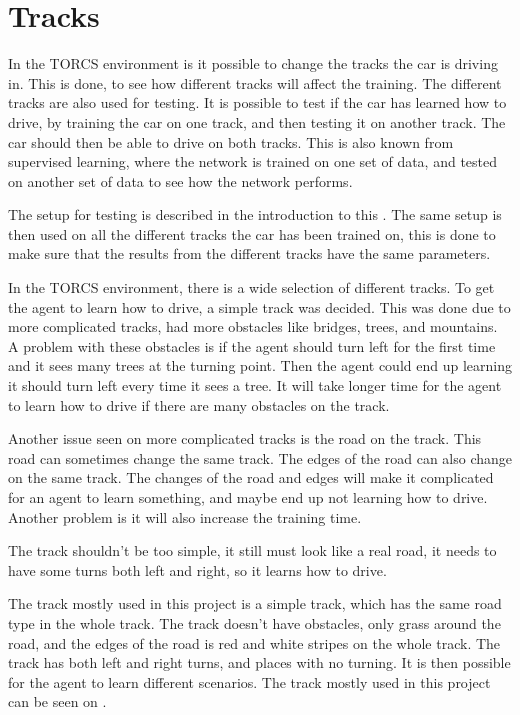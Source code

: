 \section{Tracks}\label{Tracks}
In the TORCS environment is it possible to change the tracks the car is driving in. This is done, to see how different tracks will affect the training. The different tracks are also used for testing. It is possible to test if the car has learned how to drive, by training the car on one track, and then testing it on another track. The car should then be able to drive on both tracks. This is also known from supervised learning, where the network is trained on one set of data, and tested on another set of data to see how the network performs.   

The setup for testing is described in the introduction to this . The same setup is then used on all the different tracks the car has been trained on, this is done to make sure that the results from the different tracks have the same parameters.  

In the TORCS environment, there is a wide selection of different tracks. To get the agent to learn how to drive, a simple track was decided. This was done due to more complicated tracks, had more obstacles like bridges, trees, and mountains. A problem with these obstacles is if the agent should turn left for the first time and it sees many trees at the turning point. Then the agent could end up learning it should turn left every time it sees a tree. It will take longer time for the agent to learn how to drive if there are many obstacles on the track.   

Another issue seen on more complicated tracks is the road on the track. This road can sometimes change the same track. The edges of the road can also change on the same track. The changes of the road and edges will make it complicated for an agent to learn something, and maybe end up not learning how to drive. Another problem is it will also increase the training time. 

The track shouldn't be too simple, it still must look like a real road, it needs to have some turns both left and right, so it learns how to drive. 

The track mostly used in this project is a simple track, which has the same road type in the whole track. The track doesn't have obstacles, only grass around the road, and the edges of the road is red and white stripes on the whole track. The track has both left and right turns, and places with no turning. It is then possible for the agent to learn different scenarios. The track mostly used in this project can be seen on .

